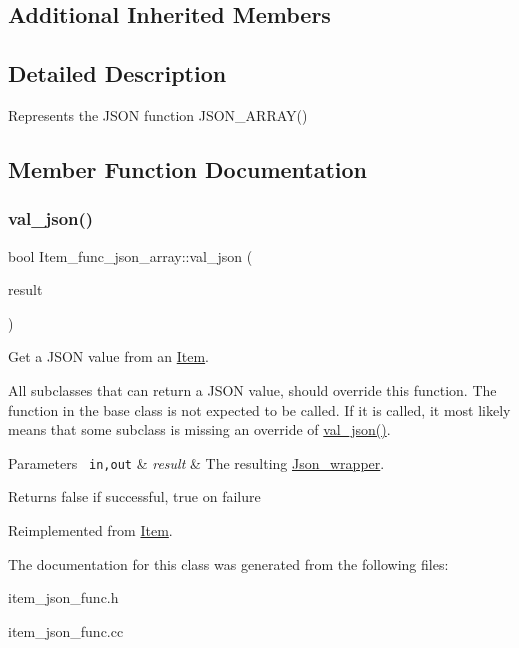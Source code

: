 \subsection*{Additional Inherited Members}


\subsection{Detailed Description}
Represents the J\+S\+ON function J\+S\+O\+N\+\_\+\+A\+R\+R\+A\+Y() 

\subsection{Member Function Documentation}
\mbox{\label{classItem__func__json__array_ae1b5ecc4639fd3d83db1afc5bed37e95}} 
\subsubsection{\texorpdfstring{val\+\_\+json()}{val\_json()}}
{\footnotesize\ttfamily bool Item\+\_\+func\+\_\+json\+\_\+array\+::val\+\_\+json (\begin{DoxyParamCaption}\item[{\mbox{\hyperlink{classJson__wrapper}{Json\+\_\+wrapper}} $\ast$}]{result }\end{DoxyParamCaption})\hspace{0.3cm}{\ttfamily [virtual]}}

Get a J\+S\+ON value from an \mbox{\hyperlink{classItem}{Item}}.

All subclasses that can return a J\+S\+ON value, should override this function. The function in the base class is not expected to be called. If it is called, it most likely means that some subclass is missing an override of \mbox{\hyperlink{classItem__func__json__array_ae1b5ecc4639fd3d83db1afc5bed37e95}{val\+\_\+json()}}.


\begin{DoxyParams}[1]{Parameters}
\mbox{\texttt{ in,out}}  & {\em result} & The resulting \mbox{\hyperlink{classJson__wrapper}{Json\+\_\+wrapper}}.\\
\hline
\end{DoxyParams}
\begin{DoxyReturn}{Returns}
false if successful, true on failure 
\end{DoxyReturn}


Reimplemented from \mbox{\hyperlink{classItem_a57e763fcde2d0a819d21e31c59611290}{Item}}.



The documentation for this class was generated from the following files\+:\begin{DoxyCompactItemize}
\item 
item\+\_\+json\+\_\+func.\+h\item 
item\+\_\+json\+\_\+func.\+cc\end{DoxyCompactItemize}
